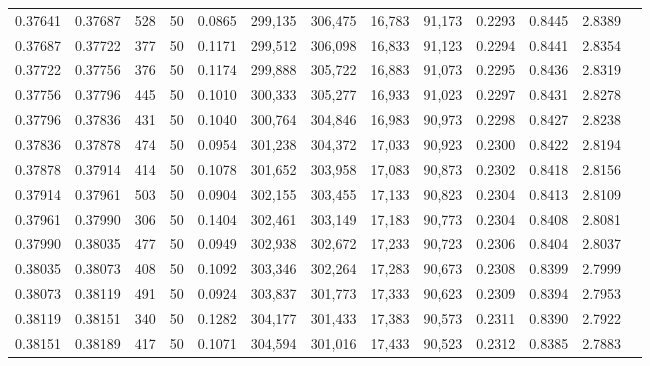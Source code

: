\begin{tabular}{rrrrrrrrrrrrr}
0.37641 & 0.37687 &   528 &  50 &                                     0.0865 & 299,135 & 306,475 &  16,783 &  91,173 & 0.2293 & 0.8445 & 2.8389 \\
0.37687 & 0.37722 &   377 &  50 &                                     0.1171 & 299,512 & 306,098 &  16,833 &  91,123 & 0.2294 & 0.8441 & 2.8354 \\
0.37722 & 0.37756 &   376 &  50 &                                     0.1174 & 299,888 & 305,722 &  16,883 &  91,073 & 0.2295 & 0.8436 & 2.8319 \\
0.37756 & 0.37796 &   445 &  50 &                                     0.1010 & 300,333 & 305,277 &  16,933 &  91,023 & 0.2297 & 0.8431 & 2.8278 \\
0.37796 & 0.37836 &   431 &  50 &                                     0.1040 & 300,764 & 304,846 &  16,983 &  90,973 & 0.2298 & 0.8427 & 2.8238 \\
0.37836 & 0.37878 &   474 &  50 &                                     0.0954 & 301,238 & 304,372 &  17,033 &  90,923 & 0.2300 & 0.8422 & 2.8194 \\
0.37878 & 0.37914 &   414 &  50 &                                     0.1078 & 301,652 & 303,958 &  17,083 &  90,873 & 0.2302 & 0.8418 & 2.8156 \\
0.37914 & 0.37961 &   503 &  50 &                                     0.0904 & 302,155 & 303,455 &  17,133 &  90,823 & 0.2304 & 0.8413 & 2.8109 \\
0.37961 & 0.37990 &   306 &  50 &                                     0.1404 & 302,461 & 303,149 &  17,183 &  90,773 & 0.2304 & 0.8408 & 2.8081 \\
0.37990 & 0.38035 &   477 &  50 &                                     0.0949 & 302,938 & 302,672 &  17,233 &  90,723 & 0.2306 & 0.8404 & 2.8037 \\
0.38035 & 0.38073 &   408 &  50 &                                     0.1092 & 303,346 & 302,264 &  17,283 &  90,673 & 0.2308 & 0.8399 & 2.7999 \\
0.38073 & 0.38119 &   491 &  50 &                                     0.0924 & 303,837 & 301,773 &  17,333 &  90,623 & 0.2309 & 0.8394 & 2.7953 \\
0.38119 & 0.38151 &   340 &  50 &                                     0.1282 & 304,177 & 301,433 &  17,383 &  90,573 & 0.2311 & 0.8390 & 2.7922 \\
0.38151 & 0.38189 &   417 &  50 &                                     0.1071 & 304,594 & 301,016 &  17,433 &  90,523 & 0.2312 & 0.8385 & 2.7883 \\

\end{tabular}

